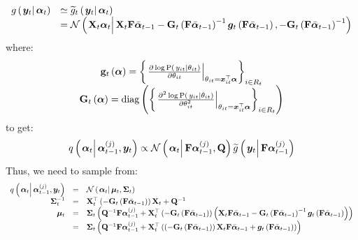 \begin{equation}\begin{array}{cl}
	\optorC{g}{\vec{y}_t}{\vec{\alpha}_t} & \simeq  \optorC{\widetilde{g}_t}{\vec{y}_t}{\vec{\alpha}_t} \\ &= %
		\normalC{
			\mat{X}_t\vec{\alpha}_t
		}{ %
			\mat{X}_t\mat{F}\vecb{\alpha}_{t - 1} - 
			\mat{G}_t\Lparen{\mat{F}\vecb{\alpha}_{t - 1}}^{-1}
			\vec{g}_t\Lparen{\mat{F}\vecb{\alpha}_{t - 1}}
		}{ %
			- \mat{G}_t\Lparen{\mat{F}\vecb{\alpha}_{t - 1}}^{-1}
		}
\end{array}\end{equation}
%
% 
where:
\begin{equation}\begin{array}{c}
\mat{g}_t\Lparen{\vec{\alpha}} = 
		\Lbrace{\left.\frac{
		\partial \log \propC{y_{it}}{\theta_{it}}
	}{
		\partial\theta_{it}
	}\right|_{\theta_{it} = \vec{x}_{it}^\top\vec{\alpha}} }_{i \in R_t} \\
%
	\mat{G}_t\Lparen{\vec{\alpha}} = 
		\diag{\Lbrace{\left.\frac{
		\partial^2 \log \propC{y_{it}}{\theta_{it}}
	}{
		\partial\theta_{it}^2
	}\right|_{\theta_{it} = \vec{x}_{it}^\top\vec{\alpha}} }_{i \in R_t}}
\end{array}\end{equation}
%
%
to get:
\begin{equation}
	\IDC{\vec{\alpha}_t}{\partic{\vec{\alpha}}{t-1}{j}, \vec{y}_t} \propto %
		\normalC{\vec{\alpha}_t}{\mat{F}\partic{\vec{\alpha}}{t-1}{j}}{\mat{Q}}
		\optorC{\widetilde{g}}{\vec{y}_t}{\mat{F}\partic{\vec{\alpha}}{t-1}{j}}
\end{equation}
%
%
Thus, we need to sample from:
\begin{equation}\label{eqn:TaylorProposalForward}\begin{array}{rcl}
	\IDC{\vec{\alpha}_t}{\partic{\vec{\alpha}}{t-1}{j}, \vec{y}_t} &=&  %
		\normalC{\vec{\alpha}_t}{\vec{\mu}_t}{\mat{\Sigma}_t} \\
%
	\mat{\Sigma}_t^{-1} &=& \mat{X}_t^\top 
		\Lparen{-\mat{G}_t\Lparen{\mat{F}\vecb{\alpha}_{t - 1}}}
		\mat{X}_t + \mat{Q}^{-1}  \\
%
	\vec{\mu}_t &=& \mat{\Sigma}_t\Lparen{
		\mat{Q}^{-1}\mat{F}\partic{\vec{\alpha}}{t-1}{j} + 
		\mat{X}_t^\top \Lparen{-\mat{G}_t\Lparen{\mat{F}\vecb{\alpha}_{t - 1}}}
		\Lparen{
			\mat{X}_t\mat{F}\vecb{\alpha}_{t - 1} - 
			\mat{G}_t\Lparen{\mat{F}\vecb{\alpha}_{t - 1}}^{-1}
			\vec{g}_t\Lparen{\mat{F}\vecb{\alpha}_{t - 1}}
		}
	} \\
%
	 &=& \mat{\Sigma}_t\Lparen{
		\mat{Q}^{-1}\mat{F}\partic{\vec{\alpha}}{t-1}{j} + 
		\mat{X}_t^\top
		\Lparen{
			\Lparen{-\mat{G}_t\Lparen{\mat{F}\vecb{\alpha}_{t - 1}}}
			\mat{X}_t\mat{F}\vecb{\alpha}_{t - 1} +
			\vec{g}_t\Lparen{\mat{F}\vecb{\alpha}_{t - 1}}
		}
	}
\end{array}\end{equation}
%
%


